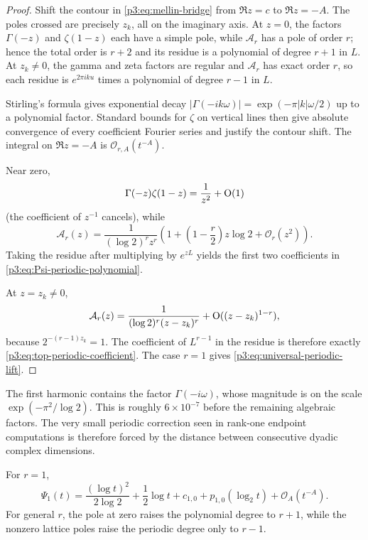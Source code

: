 \documentclass[11pt,oneside]{article}
\theoremstyle{definition}
\theoremstyle{remark}
\newcommand{\bigO}{\mathcal O}
\begin{document}
\begin{proof}
Shift the contour in \eqref{p3:eq:mellin-bridge} from $\Re z=c$ to $\Re z=-A$.  The poles crossed are precisely $z_k$, all on the imaginary axis.  At $z=0$, the factors $\Gamma(-z)$ and $\zeta(1-z)$ each have a simple pole, while $\mathcal A_r$ has a pole of order $r$; hence the total order is $r+2$ and its residue is a polynomial of degree $r+1$ in $L$.  At $z_k\ne0$, the gamma and zeta factors are regular and $\mathcal A_r$ has exact order $r$, so each residue is $e^{2\pi iku}$ times a polynomial of degree $r-1$ in $L$.

Stirling's formula gives exponential decay
$|\Gamma(-ik\omega)|=\exp(-\pi|k|\omega/2)$ up to a polynomial factor.  Standard bounds for $\zeta$ on vertical lines then give absolute convergence of every coefficient Fourier series and justify the contour shift.  The integral on $\Re z=-A$ is $\bigO_{r,A}(t^{-A})$.

Near zero,
\[
 \Gamma(-z)\zeta(1-z)=\frac1{z^2}+\mathrm O(1)
\]
(the coefficient of $z^{-1}$ cancels), while
\[
 \mathcal A_r(z)=\frac1{(\log2)^rz^r}
 \left(1+\left(1-\frac r2\right)z\log2+\bigO_r(z^2)\right).
\]
Taking the residue after multiplying by $e^{zL}$ yields the first two coefficients in \eqref{p3:eq:Psi-periodic-polynomial}.

At $z=z_k\ne0$,
\[
 \mathcal A_r(z)=\frac1{(\log2)^r(z-z_k)^r}
 +\mathrm O((z-z_k)^{1-r}),
\]
because $2^{-(r-1)z_k}=1$.  The coefficient of $L^{r-1}$ in the residue is therefore exactly \eqref{p3:eq:top-periodic-coefficient}.  The case $r=1$ gives \eqref{p3:eq:universal-periodic-lift}.
\end{proof}

\begin{remark}
The first harmonic contains the factor
$\Gamma(-i\omega)$, whose magnitude is on the scale
$\exp(-\pi^2/\log2)$.  This is roughly $6\times10^{-7}$ before the remaining algebraic factors.  The very small periodic correction seen in rank-one endpoint computations is therefore forced by the distance between consecutive dyadic complex dimensions.
\end{remark}

\begin{corollary}\label{p3:cor:rank-one-Psi}
For $r=1$,
\begin{equation}\label{p3:eq:rank-one-Psi}
 \Psi_1(t)=\frac{(\log t)^2}{2\log2}
 +\frac12\log t+c_{1,0}+p_{1,0}(\log_2t)
 +\bigO_A(t^{-A}).
\end{equation}
For general $r$, the pole at zero raises the polynomial degree to $r+1$, while the nonzero lattice poles raise the periodic degree only to $r-1$.
\end{corollary}
\end{document}
